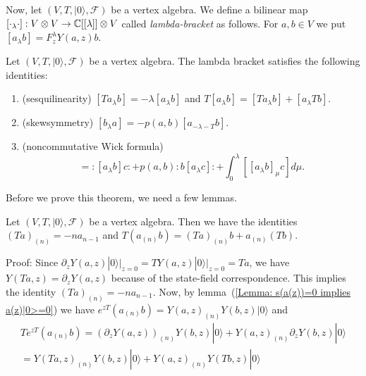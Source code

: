 Now, let $(V,T,|0\rangle,\mathcal{F})$ be a vertex algebra. We define a bilinear map $[\cdot_\lambda\cdot]:V\otimes V\rightarrow\mathbb{C}[[\lambda]]\otimes V$ called \textit{lambda-bracket} as follows. For $a,b\in V$ we put $[a_\lambda b]=F_z^\lambda Y(a,z)b$.
\begin{dang}
    \begin{theorem}\label{Theorem: lambda bracket identities}\cite{de2006finite}
    Let $(V,T,|0\rangle,\mathcal{F})$ be a vertex algebra. The lambda bracket satisfies the following identities:
    \begin{enumerate}
        \item[(1)] (sesquilinearity) $[Ta_\lambda b]=-\lambda[a_\lambda b]$ and $T[a_\lambda b]=[Ta_\lambda b]+[a_\lambda Tb]$.
        \item[(2)] (skewsymmetry) $[b_\lambda a]=-p(a,b)[a_{-\lambda-T}b]$.
        \item[(3)] (noncommutative Wick formula) 
        \begin{equation}
            [a_{\lambda}:bc:]=:[a_\lambda b]c:+p(a,b):b[a_\lambda c]:+\int_0^\lambda[[a_\lambda b]_\mu c]d\mu.
        \end{equation}
    \end{enumerate}
    \end{theorem}
\end{dang}
Before we prove this theorem, we need a few lemmas.
\begin{dang}
    \begin{lemma}\label{Lemma: T(anb)=Tanb+anTb and Tan=-na(n-1)}\cite{de2006finite}
        Let $(V,T,|0\rangle,\mathcal{F})$ be a vertex algebra. Then we have the identities
        $(Ta)_{(n)}=-na_{n-1}$ and $T(a_{(n)}b)=(Ta)_{(n)}b+a_{(n)}(Tb)$.
    \end{lemma}
\end{dang}
Proof: Since $\partial_zY(a,z)|0\rangle\big|_{z=0}=TY(a,z)|0\rangle\big|_{z=0}=Ta$, we have $Y(Ta,z)=\partial_zY(a,z)$ because of the state-field correspondence. This implies the identity $(Ta)_{(n)}=-na_{n-1}$. Now, by lemma~(\ref{Lemma: s(a(z))=0 implies a(z)|0>=0}) we have $e^{zT}(a_{(n)}b)=Y(a,z)_{(n)}Y(b,z)|0\rangle$ and
\begin{equation}
\begin{split}
      Te^{zT}(a_{(n)}b)=(\partial_zY(a,z))_{(n)}Y(b,z)|0\rangle+Y(a,z)_{(n)}\partial_zY(b,z)|0\rangle\\
      =Y(Ta,z)_{(n)}Y(b,z)|0\rangle+Y(a,z)_{(n)}Y(Tb,z)|0\rangle
\end{split}
\end{equation}
